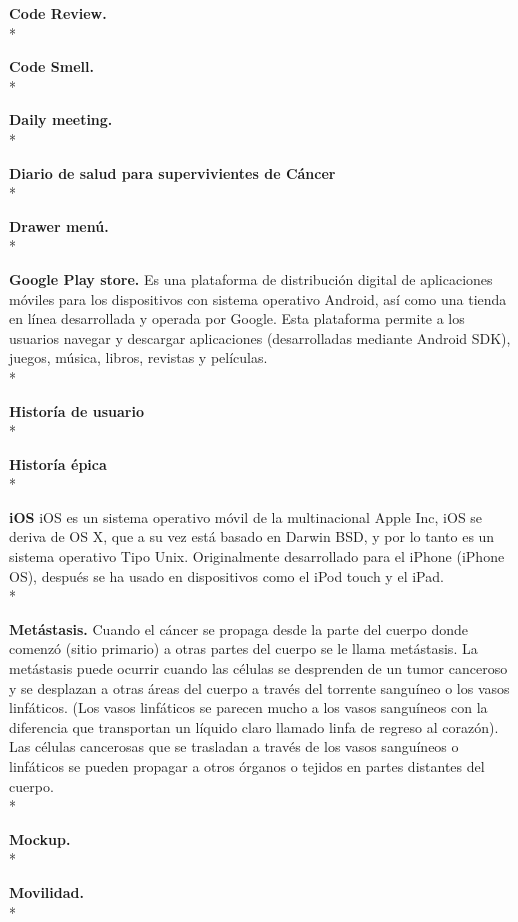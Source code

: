 \documentclass[../pfc.tex]{subfiles}
\begin{document}
		\textbf{Code Review.}\\*
		
		\textbf{Code Smell.}\\*
		
		\textbf{Daily meeting.}\\*
		
		\textbf{Diario de salud para supervivientes de Cáncer}\\*
		
		\textbf{Drawer menú.}\\*
		
		\textbf{Google Play store.}
		Es una plataforma de distribución digital de aplicaciones móviles para los dispositivos con sistema operativo Android, así como una tienda en línea desarrollada y operada por Google. Esta plataforma permite a los usuarios navegar y descargar aplicaciones (desarrolladas mediante Android SDK), juegos, música, libros, revistas y películas.\\*
		
		\textbf{Historía de usuario}\\*
		
		\textbf{Historía épica}\\*
		
		\textbf{iOS}
		iOS es un sistema operativo móvil de la multinacional Apple Inc, iOS se deriva de OS X, que a su vez está basado en Darwin BSD, y por lo tanto es un sistema operativo Tipo Unix. Originalmente desarrollado para el iPhone (iPhone OS), después se ha usado en dispositivos como el iPod touch y el iPad. \\*
		
		\textbf{Metástasis.}
		Cuando el cáncer se propaga desde la parte del cuerpo donde comenzó (sitio primario) a otras partes del cuerpo se le llama metástasis. La metástasis puede ocurrir cuando las células se desprenden de un tumor canceroso y se desplazan a otras áreas del cuerpo a través del torrente sanguíneo o los vasos linfáticos. (Los vasos linfáticos se parecen mucho a los vasos sanguíneos con la diferencia que transportan un líquido claro llamado linfa de regreso al corazón). Las células cancerosas que se trasladan a través de los vasos sanguíneos o linfáticos se pueden propagar a otros órganos o tejidos en partes distantes del cuerpo.\cite{metastasis}\\*\
		
		\textbf{Mockup.}\\*
		
		\textbf{Movilidad.}\\*
		
\end{document}
